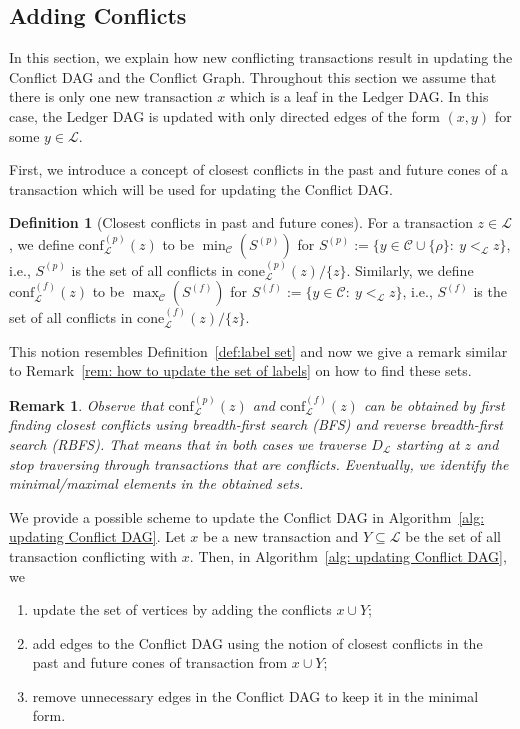 \documentclass[11pt]{article}
\newcommand{\orig}{\rho}
\newcommand{\conflictset}{\mathcal{C}}
\newcommand{\ledger}{\mathcal{L}}
\newcommand{\LedgerDAG}{D_{\ledger}}
\newcommand{\cone}[3]{\mathrm{cone}_{#2}^{(#1)}\left(#3\right)}
\newcommand{\conflictsInCone}[3]{\mathrm{conf}^{(#1)}_{#2}\left(#3\right)}
\theoremstyle{plain}
\newtheorem{remark}{Remark}
\theoremstyle{definition}
\newtheorem{definition}{Definition}
\numberwithin{definition}{section}
\numberwithin{lemma}{section}
\numberwithin{ass}{section}
\numberwithin{remark}{section}
\numberwithin{example}{section}
\numberwithin{proposition}{section}
\numberwithin{theorem}{section}
\begin{document}
\subsection{Adding Conflicts}\label{sec:ConflictAddition}
In this section, we explain how new  conflicting transactions result in updating the Conflict DAG and the Conflict Graph. Throughout this section we assume  that there is only one new transaction $x$ which is a leaf in the Ledger DAG. In this case, the Ledger DAG is updated with only directed edges of the form $(x,y)$ for some $y\in \ledger$. 

First, we introduce a concept of closest conflicts in the past and future cones of a transaction which will be used for updating the Conflict DAG. 


\begin{definition}[Closest conflicts in past and future cones]\label{def: closest conflicts}
For a transaction $z\in \ledger$, we define $\conflictsInCone{p}{\ledger}{z}$ to be $\min_{\conflictset}(S^{(p)})$ for $S^{(p)}:=\{y\in\conflictset\cup \{\orig\}:\ y<_{\ledger} z \}$, i.e., $S^{(p)}$ is the set of all conflicts in $\cone{p}{\ledger}{z}/\{z\}$.  Similarly, we define $\conflictsInCone{f}{\ledger}{z}$ to be $\max_{\conflictset}(S^{(f)})$ for $S^{(f)}:=\{y\in\conflictset:\ y<_{\ledger} z \}$, i.e., $S^{(f)}$ is the set of all conflicts in $\cone{f}{\ledger}{z}/\{z\}$.
\end{definition}

This notion resembles Definition~\ref{def:label set} and now we give a remark similar to Remark~\ref{rem: how to update the set of labels} on how to find these sets.  
\begin{remark}
Observe that $\conflictsInCone{p}{\ledger}{z}$  and   $\conflictsInCone{f}{\ledger}{z}$ can be obtained by first finding closest conflicts using breadth-first search (BFS) and reverse breadth-first search (RBFS). 
That means that in both cases we traverse $\LedgerDAG$ starting  at $z$ and stop traversing through transactions that are conflicts. Eventually, we identify the minimal/maximal elements in the obtained sets. 
\end{remark}

We provide a possible scheme to update the Conflict DAG in Algorithm~\ref{alg: updating Conflict DAG}.
Let $x$ be a new transaction and $Y\subseteq \ledger$ be the set of all transaction conflicting with $x$. Then, in Algorithm~\ref{alg: updating Conflict DAG}, we

\begin{enumerate}[leftmargin=*]
    \item update the set of vertices by adding the conflicts $x\cup Y$;
    \item add edges to the Conflict DAG using the notion of closest  conflicts in the past and future cones of transaction from $x\cup Y$;
    \item remove unnecessary edges in the Conflict DAG to keep it in the minimal form.
\end{enumerate} 
\end{document}
